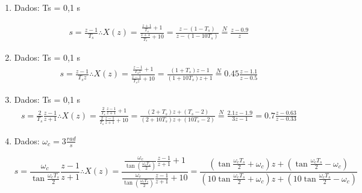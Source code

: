 \documentclass[twoside, fleqn]{article}
\begin{document}
    \begin{enumerate}
        \item %
        Dados: Ts = 0,1 s
        
            \begin{equation}
                \begin{split}
                    s = \frac{z - 1}{T_s} \therefore X(z) = \frac{\frac{z+1}{T_s} + 1}{\frac{z+1}{T_s} + 10} = \frac{z - (1-T_s)}{z - (1-10T_s)} \stackrel{N}{=} \frac{z - 0.9}{z} 
                \end{split}
            \end{equation}
        
        \item %
        Dados: Ts = 0,1 s
            \begin{equation}
                \begin{split}
                    s = \frac{z - 1}{T_s z} \therefore X(z) = \frac{\frac{z-1}{T_s z} + 1}{\frac{z-1}{T_s z} + 10} = \frac{(1+T_s) z - 1}{(1 + 10T_s) z + 1} \stackrel{N}{=} 0.45 \frac{z - 1.1}{z - 0.5}
                \end{split}
            \end{equation}
        
        \item %
        Dados: Ts = 0,1 s
            \begin{equation}
                \begin{split}
                    s = \frac{2}{T_s} \frac{z - 1}{z+1} \therefore X(z) = \frac{\frac{2}{T_s} \frac{z-1}{z+1} + 1}{\frac{2}{T_s} \frac{z-1}{z+1} + 10} = \frac{(2+T_s)z + (T_s - 2)}{(2 + 10T_s) z + (10 T_s - 2)} \stackrel{N}{=} \frac{2.1z - 1.9}{3z - 1} = 0.7\frac{z-0.63}{z-0.33}
                \end{split}
            \end{equation}
        
        \item %
        Dados: $\omega_c = 3 \frac{rad}{s}$
            
            \begin{equation}
                s = \frac{\omega_c}{\tan{\frac{\omega_c T_s}{2}}} \frac{z-1}{z+1} \therefore X(z) = \frac{\frac{\omega_c}{\tan(\frac{\omega_c T_s}{2})} \frac{z-1}{z+1} + 1}{\frac{\omega_c}{\tan(\frac{\omega_c T_s}{2})} \frac{z-1}{z+1} + 10} = \frac{(\tan{\frac{\omega_c T_s}{2}} + \omega_c) z + (\tan{\frac{\omega_c T_s}{2}} - \omega_c)}{(10 \tan{\frac{\omega_c T_s}{2}} + \omega_c) z + (10 \tan{\frac{\omega_c T_s}{2}} - \omega_c)} 
            \end{equation}
            

\end{enumerate}
\end{document}
